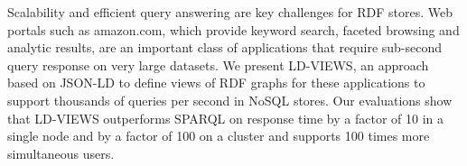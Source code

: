 Scalability and efficient query answering are key challenges for RDF stores.
Web portals such as amazon.com, which provide keyword search, faceted browsing and analytic results, are an important class of applications that require sub-second query response on very large datasets.
We present LD-VIEWS, an approach based on JSON-LD to define views of RDF graphs for these applications to support thousands of queries per second in NoSQL stores.
Our evaluations show that LD-VIEWS outperforms SPARQL on response time by a factor of 10 in a single node and by a factor of 100 on a cluster and supports 100 times more simultaneous users.

